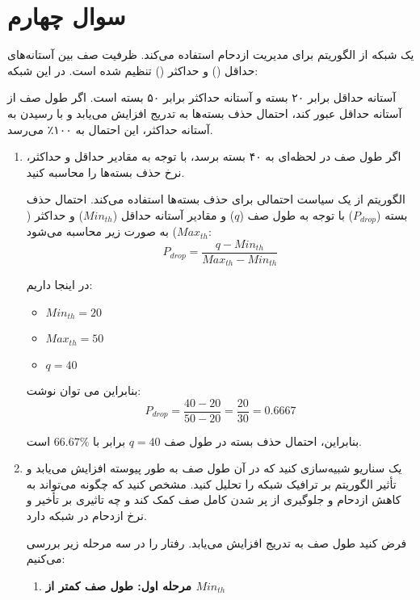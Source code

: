 \section{سوال چهارم}


یک شبکه از الگوریتم  برای مدیریت ازدحام استفاده می‌کند. ظرفیت صف بین آستانه‌های حداقل () و حداکثر () تنظیم شده است. در این شبکه:


آستانه حداقل برابر ۲۰ بسته و آستانه حداکثر برابر ۵۰ بسته است. اگر طول صف از آستانه حداقل عبور کند، احتمال حذف بسته‌ها به تدریج افزایش می‌یابد و با رسیدن به آستانه حداکثر، این احتمال به ۱۰۰٪ می‌رسد.

\begin{enumerate}
	\item 
	اگر طول صف در لحظه‌ای به ۴۰ بسته برسد، با توجه به مقادیر حداقل و حداکثر، نرخ حذف بسته‌ها را محاسبه کنید.
	
	\begin{qsolve}
		الگوریتم  از یک سیاست احتمالی برای حذف بسته‌ها استفاده می‌کند. احتمال حذف بسته (\( P_{drop} \)) با توجه به طول صف (\( q \)) و مقادیر آستانه حداقل (\( Min_{th} \)) و حداکثر (\( Max_{th} \)) به صورت زیر محاسبه می‌شود:
		\[
		P_{drop} = \frac{q - Min_{th}}{Max_{th} - Min_{th}}
		\]
		
		در اینجا داریم:
		\begin{itemize}
			\item \( Min_{th} = 20 \)
			\item \( Max_{th} = 50 \)
			\item \( q = 40 \)
		\end{itemize}
		
		بنابراین می توان نوشت:
		\[
		P_{drop} = \frac{40 - 20}{50 - 20} = \frac{20}{30} = 0.6667
		\]
		
		بنابراین، احتمال حذف بسته در طول صف \( q = 40 \) برابر با \( 66.67\% \) است.
		
	\end{qsolve}
	
	
	\item 
	یک سناریو شبیه‌سازی کنید که در آن طول صف به طور پیوسته افزایش می‌یابد و تأثیر الگوریتم  بر ترافیک شبکه را تحلیل کنید. مشخص کنید که چگونه  می‌تواند به کاهش ازدحام و جلوگیری از پر شدن کامل صف کمک کند و چه تاثیری بر تأخیر و نرخ ازدحام در شبکه دارد.
	\begin{qsolve}
		فرض کنید طول صف به تدریج افزایش می‌یابد. رفتار  را در سه مرحله زیر بررسی می‌کنیم:
		
		
		\begin{enumerate}
			\item \textbf{{مرحله اول: طول صف کمتر از \( Min_{th} \)}}
			

\end{enumerate}
\end{qsolve}
\end{enumerate}
